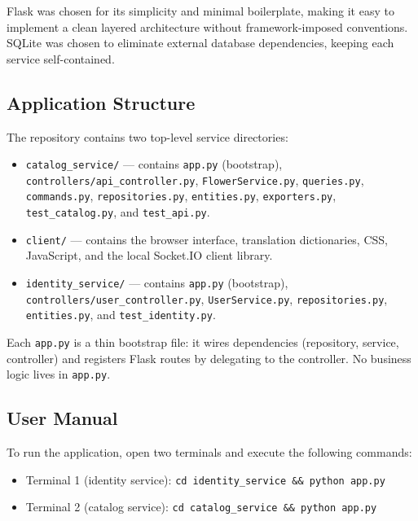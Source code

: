 \par Flask was chosen for its simplicity and minimal boilerplate, making it easy to implement a clean layered architecture without framework-imposed conventions. SQLite was chosen to eliminate external database dependencies, keeping each service self-contained.

\subsection{Application Structure}

\par The repository contains two top-level service directories:

\begin{itemize}
    \item \texttt{catalog\_service/} — contains \texttt{app.py} (bootstrap), \texttt{controllers/api\_controller.py}, \texttt{FlowerService.py}, \texttt{queries.py}, \texttt{commands.py}, \texttt{repositories.py}, \texttt{entities.py}, \texttt{exporters.py}, \texttt{test\_catalog.py}, and \texttt{test\_api.py}.
    \item \texttt{client/} — contains the browser interface, translation dictionaries, CSS, JavaScript, and the local Socket.IO client library.
    \item \texttt{identity\_service/} — contains \texttt{app.py} (bootstrap), \texttt{controllers/user\_controller.py}, \texttt{UserService.py}, \texttt{repositories.py}, \texttt{entities.py}, and \texttt{test\_identity.py}.
\end{itemize}

\par Each \texttt{app.py} is a thin bootstrap file: it wires dependencies (repository, service, controller) and registers Flask routes by delegating to the controller. No business logic lives in \texttt{app.py}.

\subsection{User Manual}

\par To run the application, open two terminals and execute the following commands:

\begin{itemize}
    \item Terminal 1 (identity service): \texttt{cd identity\_service \&\& python app.py}
    \item Terminal 2 (catalog service): \texttt{cd catalog\_service \&\& python app.py}
\end{itemize}

